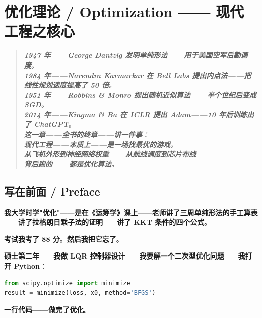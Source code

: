 
\chapter{优化理论 / Optimization —— 现代工程之核心}
\label{ch:opt}

\begin{quote}\itshape
\textbf{1947 年——George Dantzig 发明单纯形法——用于美国空军后勤调度}。\\
\textbf{1984 年——Narendra Karmarkar 在 Bell Labs 提出内点法——把线性规划速度提高了 50 倍}。\\
\textbf{1951 年——Robbins \& Monro 提出随机近似算法——半个世纪后变成 SGD}。\\
\textbf{2014 年——Kingma \& Ba 在 ICLR 提出 Adam——10 年后训练出了 ChatGPT}。\\[6pt]
\textbf{这一章——\textbf{全书的终章}——讲一件事}：\\
\textbf{现代工程——本质上——是一场\textbf{找最优}的游戏}。\\
\textbf{从飞机外形到神经网络权重——从航线调度到芯片布线}——\\
\textbf{背后跑的——都是优化算法}。
\end{quote}

\section{写在前面 / Preface}

\textbf{我大学时学"优化"}——\textbf{是在《运筹学》课上}——\textbf{老师讲了三周单纯形法的手工算表}——\textbf{讲了拉格朗日乘子法的证明}——\textbf{讲了 KKT 条件的四个公式}。

\textbf{考试我考了 88 分}。\textbf{然后我把它忘了}。

\textbf{硕士第二年}——\textbf{我做 LQR 控制器设计}——\textbf{我要解一个二次型优化问题}——\textbf{我打开 Python}：

\begin{lstlisting}[language=Python]
from scipy.optimize import minimize
result = minimize(loss, x0, method='BFGS')
\end{lstlisting}

\textbf{一行代码——做完了优化}。

